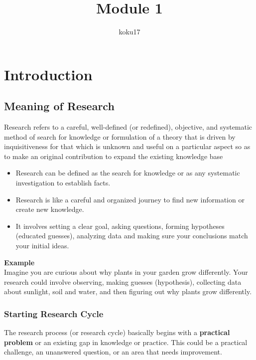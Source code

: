 \documentclass{article}
\author{koku17}
\title{Module 1}
\begin{document}
	 \maketitle \newpage
	  \tableofcontents
	 \listoffigures
	 \listoftables \newpage

	\section{Introduction}
	\subsection{Meaning of Research}
	Research refers to a careful, well-defined (or redefined), objective, and systematic method of search for
	knowledge or formulation of a theory that is driven by inquisitiveness for that which is unknown and useful
	on a particular aspect so as to make an original contribution to expand the existing knowledge base

	\begin{itemize}
		\item Research can be defined as the search for knowledge or as any systematic investigation to
			establish facts.
		\item Research is like a careful and organized journey to find new information or create new knowledge.
		\item It involves setting a clear goal, asking questions, forming hypotheses (educated guesses),
			analyzing data and making sure your conclusions match your initial ideas.
	\end{itemize}

	\noindent \textbf{Example} \\
	Imagine you are curious about why plants in your garden grow differently. Your research could involve
	observing, making guesses (hypothesis), collecting data about sunlight, soil and water, and then figuring
	out why plants grow differently. \newpage

	\subsubsection{Starting Research Cycle}
	The research process (or research cycle) basically begins with a \textbf{practical problem} or an existing
	gap in knowledge or practice. This could be a practical challenge, an unanswered question, or an area that
	needs improvement.
\end{document}
